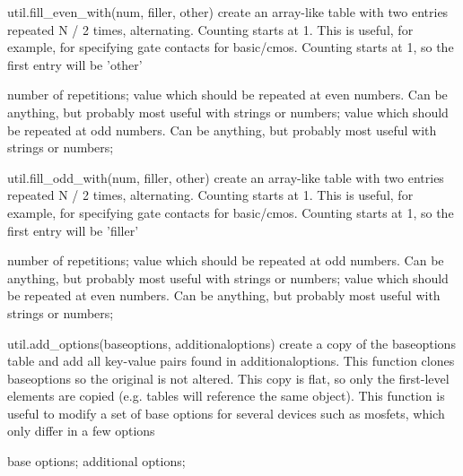 \begin{APIfunc}{util.fill\_even\_with(num, filler, other)}
    create an array-like table with two entries repeated N / 2 times, alternating. Counting starts at 1. This is useful, for example, for specifying gate contacts for basic/cmos. Counting starts at 1, so the first entry will be 'other'
    \begin{APIparameters}
            number of repetitions;
            value which should be repeated at even numbers. Can be anything, but probably most useful with strings or numbers;
            value which should be repeated at odd numbers. Can be anything, but probably most useful with strings or numbers;
    \end{APIparameters}
\end{APIfunc}
\begin{APIfunc}{util.fill\_odd\_with(num, filler, other)}
    create an array-like table with two entries repeated N / 2 times, alternating. Counting starts at 1. This is useful, for example, for specifying gate contacts for basic/cmos. Counting starts at 1, so the first entry will be 'filler'
    \begin{APIparameters}
            number of repetitions;
            value which should be repeated at odd numbers. Can be anything, but probably most useful with strings or numbers;
            value which should be repeated at even numbers. Can be anything, but probably most useful with strings or numbers;
    \end{APIparameters}
\end{APIfunc}
\begin{APIfunc}{util.add\_options(baseoptions, additionaloptions)}
    create a copy of the baseoptions table and add all key-value pairs found in additionaloptions. This function clones baseoptions so the original is not altered. This copy is flat, so only the first-level elements are copied (e.g. tables will reference the same object). This function is useful to modify a set of base options for several devices such as mosfets, which only differ in a few options
    \begin{APIparameters}
            base options;
            additional options;
    \end{APIparameters}
\end{APIfunc}
